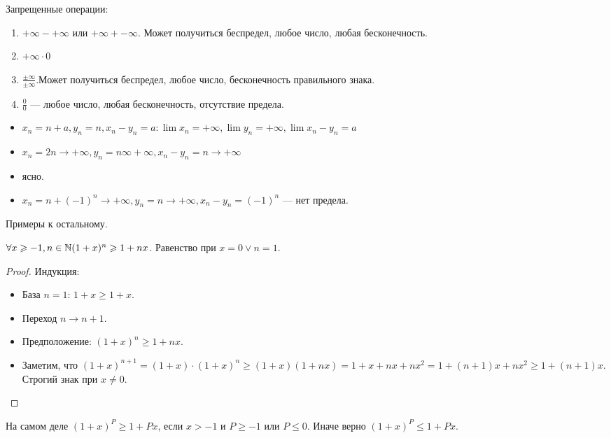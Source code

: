 Запрещенные операции:
\begin{enumerate}
    \item $+\infty - +\infty$ или  $+\infty + -\infty$. Может получиться беспредел, любое число, любая бесконечность.
    \item $+\infty \cdot 0$
    \item $\frac{\pm \infty}{\pm \infty}$.Может получиться беспредел, любое число, бесконечность правильного знака.
    \item $\frac{0}{0}$ --- любое число, любая бесконечность, отсутствие предела.
\end{enumerate}
\begin{example}
    \slashn
    \begin{itemize}
        \item $x_n = n + a, y_n=n, x_n-y_n=a: \lim x_n = +\infty, \lim y_n = +\infty, \lim x_n - y_n = a$
        \item  $x_n = 2n \to +\infty, y_n = n \infty + \infty, x_n - y_n = n \to +\infty$
        \item ясно.
        \item  $x_n = n + (-1)^n \to +\infty, y_n = n \to +\infty, x_n - y_n = (-1)^n$ --- нет предела.
    \end{itemize}
\end{example}
\begin{exerc}
    Примеры к остальному.
\end{exerc}
\begin{theorem}
    $\forall x \geqslant -1, n \in \mathbb{N} (1+x)^n \geqslant 1 + nx$. Равенство при $x=0 \lor n=1$.
\end{theorem}
\begin{proof}
    Индукция:
    \begin{itemize}
        \item База $n=1$: $1+x  \ge 1+x$.
        \item Переход $n \to n+1$.
        \item Предположение: $(1+x)^n \ge 1+nx$.
        \item Заметим, что $(1+x)^{n+1} = (1+x)\cdot(1+x)^n \ge (1+x)(1+nx) = 1 + x + nx + nx^2 = 1 + (n+1)x + nx^2 \ge 1 + (n+1)x$. Строгий знак при $x \neq 0$.
    \end{itemize}
\end{proof}
\begin{remark}
    На самом деле $(1+x)^P \ge 1 + Px$, если $x > -1$ и  $P \ge -1$ или $P \le 0$. Иначе верно $(1+x)^P \le 1 + Px$.
\end{remark}
